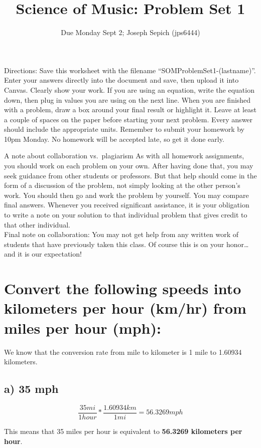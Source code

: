 \documentclass[]{article}
\title{Science of Music: Problem Set 1}
\subtitle{Due Monday Sept 2; Joseph Sepich (jps6444)}
\author{}
\date{}
\begin{document}
\maketitle

Directions: Save this worksheet with the filename
``SOMProblemSet1-(lastname)''. Enter your answers directly into the
document and save, then upload it into Canvas. Clearly show your work.
If you are using an equation, write the equation down, then plug in
values you are using on the next line. When you are finished with a
problem, draw a box around your final result or highlight it. Leave at
least a couple of spaces on the paper before starting your next problem.
Every answer should include the appropriate units. Remember to submit
your homework by 10pm Monday. No homework will be accepted late, so get
it done early.

A note about collaboration vs.~plagiarism As with all homework
assignments, you should work on each problem on your own. After having
done that, you may seek guidance from other students or professors. But
that help should come in the form of a discussion of the problem, not
simply looking at the other person's work. You should then go and work
the problem by yourself. You may compare final answers. Whenever you
received significant assistance, it is your obligation to write a note
on your solution to that individual problem that gives credit to that
other individual.\\
Final note on collaboration: You may not get help from any written work
of students that have previously taken this class. Of course this is on
your honor\ldots{}and it is our expectation!

\section{Convert the following speeds into kilometers per hour (km/hr)
from miles per hour
(mph):}\label{convert-the-following-speeds-into-kilometers-per-hour-kmhr-from-miles-per-hour-mph}

We know that the conversion rate from mile to kilometer is 1 mile to
1.60934 kilometers.

\subsection{a) 35 mph}\label{a-35-mph}

\[\frac{35 mi}{1 hour} * \frac{1.60934 km}{1 mi} = 56.3269 mph\]

This means that 35 miles per hour is equivalent to \textbf{56.3269
kilometers per hour}.
\end{document}

